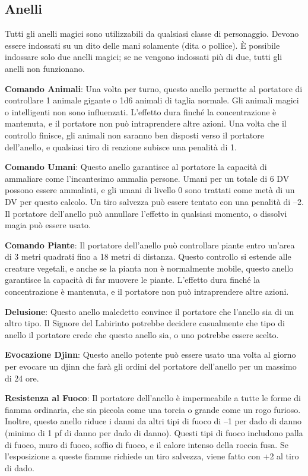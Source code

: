 \documentclass{article}
\begin{document}
\begin{multicols}{2}
\section{Anelli}

Tutti gli anelli magici sono utilizzabili da qualsiasi classe di personaggio. Devono essere indossati su un dito delle mani solamente (dita o pollice). È possibile indossare solo due anelli magici; se ne vengono indossati più di due, tutti gli anelli non funzionano.

\textbf{Comando Animali}: Una volta per turno, questo anello permette al portatore di controllare 1 animale gigante o 1d6 animali di taglia normale. Gli animali magici o intelligenti non sono influenzati. L'effetto dura finché la concentrazione è mantenuta, e il portatore non può intraprendere altre azioni. Una volta che il controllo finisce, gli animali non saranno ben disposti verso il portatore dell'anello, e qualsiasi tiro di reazione subisce una penalità di 1.

\textbf{Comando Umani}: Questo anello garantisce al portatore la capacità di ammaliare come l'incantesimo ammalia persone. Umani per un totale di 6 DV possono essere ammaliati, e gli umani di livello 0 sono trattati come metà di un DV per questo calcolo. Un tiro salvezza può essere tentato con una penalità di –2. Il portatore dell'anello può annullare l'effetto in qualsiasi momento, o dissolvi magia può essere usato.

\textbf{Comando Piante}: Il portatore dell'anello può controllare piante entro un'area di 3 metri quadrati fino a 18 metri di distanza. Questo controllo si estende alle creature vegetali, e anche se la pianta non è normalmente mobile, questo anello garantisce la capacità di far muovere le piante. L'effetto dura finché la concentrazione è mantenuta, e il portatore non può intraprendere altre azioni.

\textbf{Delusione}: Questo anello maledetto convince il portatore che l'anello sia di un altro tipo. Il Signore del Labirinto potrebbe decidere casualmente che tipo di anello il portatore crede che questo anello sia, o uno potrebbe essere scelto.

\textbf{Evocazione Djinn}: Questo anello potente può essere usato una volta al giorno per evocare un djinn che farà gli ordini del portatore dell'anello per un massimo di 24 ore.

\textbf{Resistenza al Fuoco}: Il portatore dell'anello è impermeabile a tutte le forme di fiamma ordinaria, che sia piccola come una torcia o grande come un rogo furioso. Inoltre, questo anello riduce i danni da altri tipi di fuoco di –1 per dado di danno (minimo di 1 pf di danno per dado di danno). Questi tipi di fuoco includono palla di fuoco, muro di fuoco, soffio di fuoco, e il calore intenso della roccia fusa. Se l'esposizione a queste fiamme richiede un tiro salvezza, viene fatto con +2 al tiro di dado.


\end{multicols}
\end{document}
